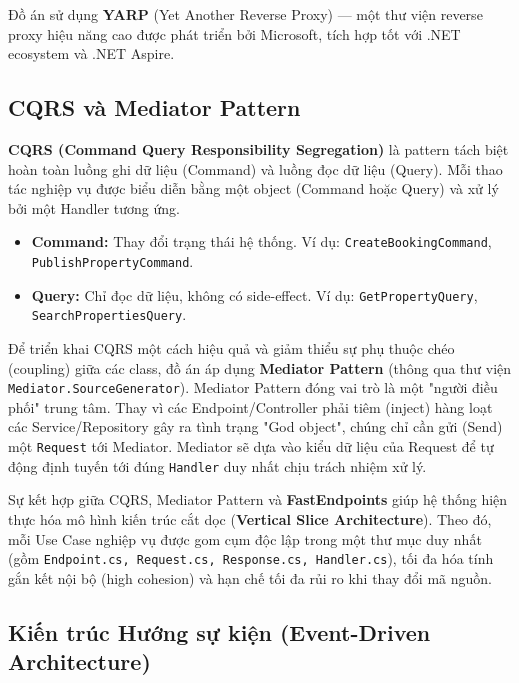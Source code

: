 Đồ án sử dụng \textbf{YARP} (Yet Another Reverse Proxy) — một thư viện reverse proxy hiệu năng cao
được phát triển bởi Microsoft, tích hợp tốt với .NET ecosystem và .NET Aspire.

\subsection{CQRS và Mediator Pattern}
\label{subsec:cqrs_mediator}

\textbf{CQRS (Command Query Responsibility Segregation)} là pattern tách biệt hoàn toàn luồng ghi dữ liệu (Command) và luồng đọc dữ liệu (Query).
Mỗi thao tác nghiệp vụ được biểu diễn bằng một object (Command hoặc Query) và xử lý bởi một Handler tương ứng.

\begin{itemize}
    \item \textbf{Command:} Thay đổi trạng thái hệ thống. Ví dụ: \texttt{CreateBookingCommand},
    \texttt{PublishPropertyCommand}.
    \item \textbf{Query:} Chỉ đọc dữ liệu, không có side-effect. Ví dụ: \texttt{GetPropertyQuery},
    \texttt{SearchPropertiesQuery}.
\end{itemize}

Để triển khai CQRS một cách hiệu quả và giảm thiểu sự phụ thuộc chéo (coupling) giữa các class, đồ án áp dụng \textbf{Mediator Pattern} (thông qua thư viện \texttt{Mediator.SourceGenerator}).
Mediator Pattern đóng vai trò là một "người điều phối" trung tâm. Thay vì các Endpoint/Controller phải tiêm (inject) hàng loạt các Service/Repository gây ra tình trạng "God object",
chúng chỉ cần gửi (Send) một \texttt{Request} tới Mediator. Mediator sẽ dựa vào kiểu dữ liệu của Request để tự động định tuyến tới đúng \texttt{Handler} duy nhất chịu trách nhiệm xử lý.

Sự kết hợp giữa CQRS, Mediator Pattern và \textbf{FastEndpoints} giúp hệ thống hiện thực hóa mô hình kiến trúc cắt dọc (\textbf{Vertical Slice Architecture}).
Theo đó, mỗi Use Case nghiệp vụ được gom cụm độc lập trong một thư mục duy nhất (gồm \texttt{Endpoint.cs, Request.cs, Response.cs, Handler.cs}),
tối đa hóa tính gắn kết nội bộ (high cohesion) và hạn chế tối đa rủi ro khi thay đổi mã nguồn.

\subsection{Kiến trúc Hướng sự kiện (Event-Driven Architecture)}
\label{subsec:eda}

